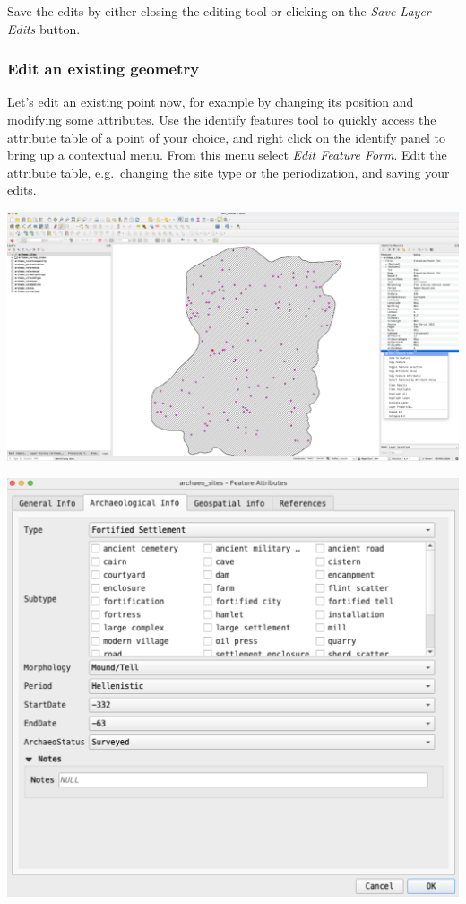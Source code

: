 \documentclass[
  letterpaper,
  DIV=11,
  numbers=noendperiod]{scrartcl}
\begin{document}
Save the edits by either closing the editing tool or clicking on the
\emph{Save Layer Edits} button.

\subsubsection{Edit an existing
geometry}\label{edit-an-existing-geometry}

Let's edit an existing point now, for example by changing its position
and modifying some attributes. Use the
\href{https://docs.qgis.org/3.34/en/docs/user_manual/introduction/general_tools.html\#identify}{identify
features tool} to quickly access the attribute table of a point of your
choice, and right click on the identify panel to bring up a contextual
menu. From this menu select \emph{Edit Feature Form}. Edit the attribute
table, e.g.~changing the site type or the periodization, and saving your
edits.

\begin{center}
\includegraphics{img/qgis-identify-attr-table.png}
\end{center}

\begin{center}
\includegraphics{img/qgis-attr-table.png}
\end{center}
\end{document}

